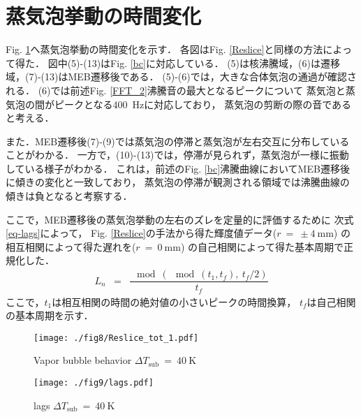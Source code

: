 \section{蒸気泡挙動の時間変化}
Fig. \ref{vapor_bubble}へ蒸気泡挙動の時間変化を示す．
各図はFig. \ref{Reslice}と同様の方法によって得た．
図中(5)-(13)はFig. \ref{bc}に対応している．
(5)は核沸騰域，(6)は遷移域，(7)-(13)はMEB遷移後である．
(5)-(6)では，大きな合体気泡の通過が確認される．
(6)では前述Fig. \ref{FFT_2}沸騰音の最大となるピークについて
蒸気泡と蒸気泡の間がピークとなる\SI{400}{~Hz}に対応しており，
蒸気泡の剪断の際の音であると考える．

また．MEB遷移後(7)-(9)では蒸気泡の停滞と蒸気泡が左右交互に分布していることがわかる．
一方で，(10)-(13)では，停滞が見られず，蒸気泡が一様に振動している様子がわかる．
これは，前述のFig. \ref{bc}沸騰曲線においてMEB遷移後に傾きの変化と一致しており，
蒸気泡の停滞が観測される領域では沸騰曲線の傾きは負となると考察する．

ここで，MEB遷移後の蒸気泡挙動の左右のズレを定量的に評価するために
次式\eqref{eq-lags}によって，
Fig. \ref{Reslice}の手法から得た輝度値データ($r~=~\pm 4~\mathrm{mm}$)
の相互相関によって得た遅れを($r~=~0~\mathrm{mm}$)
の自己相関によって得た基本周期で正規化した．
\begin{eqnarray}
  L_{n} &=&\dfrac{\mod(\mod(t_1,t_f),~t_f/2)}{t_f}
  \label{eq-lags}
\end{eqnarray}
ここで，$t_1$は相互相関の時間の絶対値の小さいピークの時間換算，
$t_f$は自己相関の基本周期を示す．

\begin{figure}[btp]
  \centering
  \texttt{[image: ./fig8/Reslice\_tot\_1.pdf]}
  \caption{Vapor bubble behavior $\Delta T_{\mathrm{sub}}~=~40~\mathrm{K}$}
  \label{vapor_bubble}
\end{figure}

\begin{figure}[btp]
  \centering
  \texttt{[image: ./fig9/lags.pdf]}
  \caption{lags $\Delta T_{\mathrm{sub}}~=~40~\mathrm{K}$}
  \label{lags}
\end{figure}
